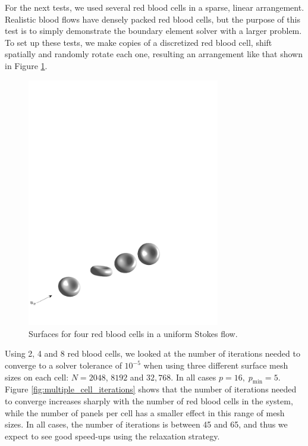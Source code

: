 \documentclass[final,leqno,]{siamltex1213}
\begin{document}
For the next tests, we used several red blood cells in a sparse, linear arrangement. Realistic blood flows have densely packed red blood cells, but the purpose of this test is to simply demonstrate the boundary element solver with a larger problem. To set up these tests, we make copies of a discretized red blood cell, shift spatially and randomly rotate each one, resulting an arrangement like that shown in Figure \ref{fig:multiple_cells}.

\begin{figure}[h]
\begin{center}
	\includegraphics[natwidth=6in,natheight=2.88in,width=0.75\textwidth]{4Cells_arrow.pdf}
	\caption{Surfaces for four red blood cells in a uniform Stokes flow.}
	\label{fig:multiple_cells}
\end{center}
\end{figure}

Using 2, 4 and 8 red blood cells, we looked at the number of iterations needed to converge to a solver tolerance of $10^{-5}$ when using three different surface mesh sizes on each cell: $N=2048$, $8192$ and $32,768$. In all cases $p = 16,\;p_{\text{min}} = 5$. Figure \ref{fig:multiple_cell_iterations} shows that the number of iterations needed to converge increases sharply with the number of red blood cells in the system, while the number of panels per cell has a smaller effect in this range of mesh sizes. In all cases, the number of iterations is between 45 and 65, and thus we expect to see good speed-ups using the relaxation strategy.
\end{document}
